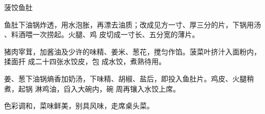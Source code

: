 \begin{recipe}{菠饺鱼肚}

\ingredients


\preparation

\step 鱼肚下油锅炸透，用水泡胀，再漂去油质；改成见方一寸、厚三分的片，下锅用汤
、料酒喂一次捞起。火腿、鸡 皮切成一寸长、五分宽的薄片。

猪肉宰茸，加酱油及少许的味精、姜米、葱花，搅匀作馅。菠菜叶挤汁入面粉内，揉面扞
成二十四张水饺皮，包 成水饺，煮熟待用。

姜、葱下油锅熵香加奶汤，下味精、胡椒、盐后，即投入鱼肚片。鸡皮、火腿稍煮，起锅
淋鸡油，舀入大碗内，碗 周再镶入水饺上席。

\features

色彩调和，菜味鲜美，别具风味，走席桌头菜。

\end{recipe}

